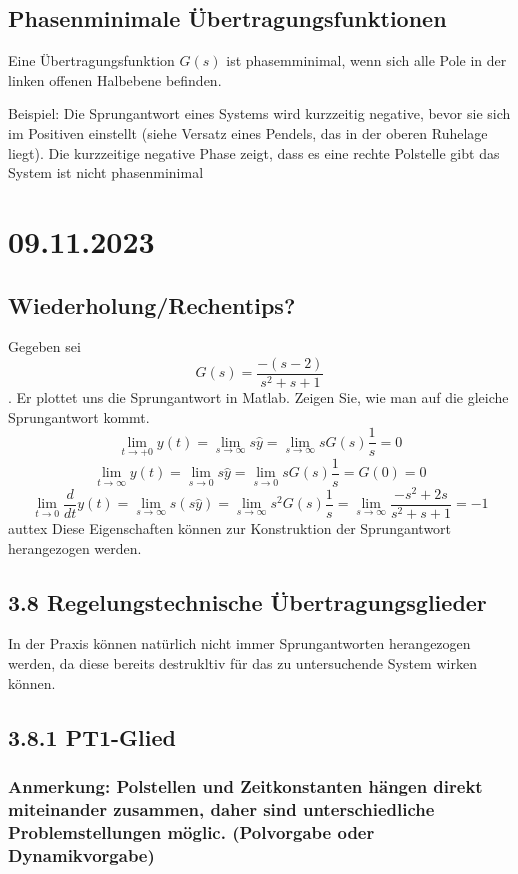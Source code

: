 \documentclass[a4paper]{article}
\begin{document}
\subsection*{Phasenminimale Übertragungsfunktionen}
Eine Übertragungsfunktion $G(s)$ ist phasemminimal, wenn sich alle Pole in der linken offenen Halbebene befinden.

Beispiel: Die Sprungantwort eines Systems wird kurzzeitig negative, bevor sie sich im Positiven einstellt (siehe Versatz eines Pendels, das in der oberen Ruhelage liegt). Die kurzzeitige negative Phase zeigt, dass es eine rechte Polstelle gibt \implies das System ist nicht phasenminimal

\section*{09.11.2023}
\subsection*{Wiederholung/Rechentips?}
Gegeben sei
\[ G(s)=\frac{-(s-2)}{s^{2}+s+1} \].
Er plottet uns die Sprungantwort in Matlab. Zeigen Sie, wie man auf die gleiche Sprungantwort kommt.
\[ \lim_{t \to +0} y(t)=\lim_{s \to \infty} s \hat{y}=\lim_{s \to \infty} sG(s) \frac{1}{s}=0 \]
\[ \lim_{t \to \infty} y(t)=\lim_{s \to 0} s \hat{y}=\lim_{s \to 0} sG(s) \frac{1}{s}=G(0)=0 \]
\[ \lim_{t \to 0} \frac{d}{dt}y(t) =\lim_{s \to \infty} s(s \hat{y})=\lim_{s \to \infty} s^{2}G(s) \frac{1}{s}=\lim_{s \to \infty} \frac{-s^{2}+2s}{s^{2}+s+1}= -1\]auttex
Diese Eigenschaften können zur Konstruktion der Sprungantwort herangezogen werden.

\subsection*{3.8 Regelungstechnische Übertragungsglieder}
In der Praxis können natürlich nicht immer Sprungantworten herangezogen werden, da diese bereits destrukltiv für das zu untersuchende System wirken können.

\subsection*{3.8.1 PT1-Glied}
\subsubsection*{Anmerkung: Polstellen und Zeitkonstanten hängen direkt miteinander zusammen, daher sind unterschiedliche Problemstellungen möglic. (Polvorgabe oder Dynamikvorgabe)}
\end{document}
